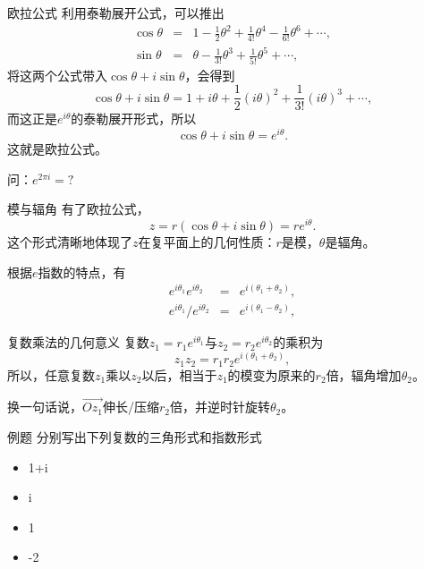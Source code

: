 \documentclass[11pt]{beamer}
\newcommand{\kong}[1][0.5]{\vspace{#1cm}}
\begin{document}
\begin{frame}{欧拉公式}
利用泰勒展开公式，可以推出
\begin{eqnarray}
\cos \theta &=& 1 - \frac{1}{2}\theta^2 + \frac{1}{4!}\theta^4 - \frac{1}{6!}\theta^6 + \cdots, \\
\sin \theta &=& \theta - \frac{1}{3!}\theta^3 + \frac{1}{5!}\theta^5 + \cdots,
\end{eqnarray}
将这两个公式带入$\cos \theta + i \sin \theta$，会得到
\begin{equation}
\cos \theta + i \sin \theta = 1 + i\theta + \frac{1}{2}(i\theta)^2 + \frac{1}{3!}(i\theta)^3 + \cdots,
\end{equation}
而这正是$e^{i\theta}$的泰勒展开形式，所以
\begin{equation}
\cos \theta + i \sin \theta = e^{i\theta}.
\end{equation}
这就是欧拉公式。

\kong[0.5]

问：$e^{2\pi i} = ?$
\end{frame}

\begin{frame}{模与辐角}
有了欧拉公式，
\begin{equation}
z = r(\cos\theta + i\sin\theta) = r e^{i\theta}.
\end{equation}
这个形式清晰地体现了$z$在复平面上的几何性质：$r$是模，$\theta$是辐角。

\kong[0.5]

根据$e$指数的特点，有
\begin{eqnarray}
e^{i\theta_1} e^{i\theta_2} &=& e^{i(\theta_1 + \theta_2)},\\
e^{i\theta_1}/e^{i\theta_2} &=& e^{i(\theta_1 - \theta_2)},
\end{eqnarray}
\end{frame}

\begin{frame}{复数乘法的几何意义}
复数$z_1 = r_1 e^{i\theta_1}$与$z_2 = r_2 e^{i\theta_2}$的乘积为
\begin{equation}
z_1 z_2 = r_1 r_2 e^{i(\theta_1 + \theta_2)},
\end{equation}
所以，任意复数$z_1$乘以$z_2$以后，相当于$z_1$的模变为原来的$r_2$倍，辐角增加$\theta_2$。

\kong[0.5]

换一句话说，$\vec{Oz_1}$伸长/压缩$r_2$倍，并逆时针旋转$\theta_2$。

\end{frame}

\begin{frame}{例题}
分别写出下列复数的三角形式和指数形式
\begin{itemize}
	\item 1+i
	\item i
	\item 1
	\item -2
\end{itemize}
\end{frame}
\end{document}
